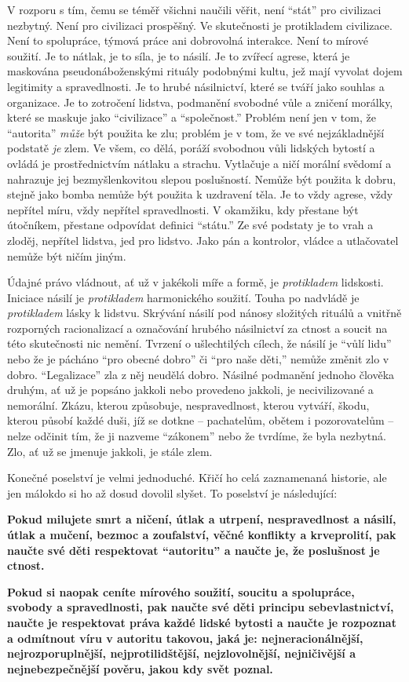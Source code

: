 \documentclass{book}
\begin{document}
V rozporu s tím, čemu se téměř všichni naučili věřit, není \enquote{stát} pro civilizaci nezbytný. Není pro civilizaci prospěšný. Ve skutečnosti je protikladem civilizace. Není to spolupráce, týmová práce ani dobrovolná interakce. Není to mírové soužití. Je to nátlak, je to síla, je to násilí. Je to zvířecí agrese, která je maskována pseudonáboženskými rituály podobnými kultu, jež mají vyvolat dojem legitimity a spravedlnosti. Je to hrubé násilnictví, které se tváří jako souhlas a organizace. Je to zotročení lidstva, podmanění svobodné vůle a zničení morálky, které se maskuje jako \enquote{civilizace} a \enquote{společnost.} Problém není jen v tom, že \enquote{autorita} \emph{může} být použita ke zlu; problém je v tom, že ve své nejzákladnější podstatě \emph{je} zlem. Ve všem, co dělá, poráží svobodnou vůli lidských bytostí a ovládá je prostřednictvím nátlaku a strachu. Vytlačuje a ničí morální svědomí a nahrazuje jej bezmyšlenkovitou slepou poslušností. Nemůže být použita k dobru, stejně jako bomba nemůže být použita k uzdravení těla. Je to vždy agrese, vždy nepřítel míru, vždy nepřítel spravedlnosti. V okamžiku, kdy přestane být útočníkem, přestane odpovídat definici \enquote{státu.} Ze své podstaty je to vrah a zloděj, nepřítel lidstva, jed pro lidstvo. Jako pán a kontrolor, vládce a utlačovatel nemůže být ničím jiným.

Údajné právo vládnout, ať už v jakékoli míře a formě, je \emph{protikladem} lidskosti. Iniciace násilí je \emph{protikladem} harmonického soužití. Touha po nadvládě je \emph{protikladem} lásky k lidstvu. Skrývání násilí pod nánosy složitých rituálů a vnitřně rozporných racionalizací a označování hrubého násilnictví za ctnost a soucit na této skutečnosti nic nemění. Tvrzení o ušlechtilých cílech, že násilí je \enquote{vůlí lidu} nebo že je pácháno \enquote{pro obecné dobro} či \enquote{pro naše děti,} nemůže změnit zlo v dobro. \enquote{Legalizace} zla z něj neudělá dobro. Násilné podmanění jednoho člověka druhým, ať už je popsáno jakkoli nebo provedeno jakkoli, je necivilizované a nemorální. Zkázu, kterou způsobuje, nespravedlnost, kterou vytváří, škodu, kterou působí každé duši, jíž se dotkne -- pachatelům, obětem i pozorovatelům -- nelze odčinit tím, že ji nazveme \enquote{zákonem} nebo že tvrdíme, že byla nezbytná. Zlo, ať už se jmenuje jakkoli, je stále zlem.

Konečné poselství je velmi jednoduché. Křičí ho celá zaznamenaná historie, ale jen málokdo si ho až dosud dovolil slyšet. To poselství je následující:

\textbf{Pokud milujete smrt a ničení, útlak a utrpení, nespravedlnost a násilí, útlak a mučení, bezmoc a zoufalství, věčné konflikty a krveprolití, pak naučte své děti respektovat \enquote{autoritu} a naučte je, že poslušnost je ctnost.}

\textbf{Pokud si naopak ceníte mírového soužití, soucitu a spolupráce, svobody a spravedlnosti, pak naučte své děti principu sebevlastnictví, naučte je respektovat práva každé lidské bytosti a naučte je rozpoznat a odmítnout víru v autoritu takovou, jaká je: nejneracionálnější, nejrozporuplnější, nejprotilidštější, nejzlovolnější, nejničivější a nejnebezpečnější pověru, jakou kdy svět poznal.}
\end{document}
